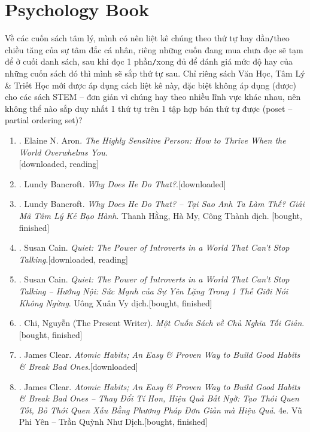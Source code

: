 \documentclass{article}
\begin{document}
\section{Psychology Book}
Về các cuốn sách tâm lý, mình có nên liệt kê chúng theo thứ tự hay dần\texttt{/}theo chiều tăng của sự tâm đắc cá nhân, riêng những cuốn đang mua chưa đọc sẽ tạm để ở cuối danh sách, sau khi đọc 1 phần\texttt{/}xong đủ để đánh giá mức độ hay của những cuốn sách đó thì mình sẽ sắp thứ tự sau. Chỉ riêng sách Văn Học, Tâm Lý \& Triết Học mới được áp dụng cách liệt kê này, đặc biệt không áp dụng (được) cho các sách STEM -- đơn giản vì chúng hay theo nhiều lĩnh vực khác nhau, nên không thể nào sắp duy nhất 1 thứ tự trên 1 tập hợp bán thứ tự được (poset -- partial ordering set)?
\begin{enumerate}
	\item \cite{Aron2013}. Elaine N. Aron. \textit{The Highly Sensitive Person: How to Thrive When the World Overwhelms You}.\\\mbox{}\hfill\textsf{[downloaded, reading]}
	\item \cite{Bansch2001}. Lundy Bancroft. \textit{Why Does He Do That?}.\hfill\textsf{[downloaded]}
	\item \cite{Bancroft2019}. Lundy Bancroft. \textit{Why Does He Do That? -- Tại Sao Anh Ta Làm Thế? Giải Mã Tâm Lý Kẻ Bạo Hành}. Thanh Hằng, Hà My, Công Thành dịch. \hfill\textsf{[bought, finished]}
	\item \cite{Cain2013}. Susan Cain. \textit{Quiet: The Power of Introverts in a World That Can't Stop Talking}.\hfill\textsf{[downloaded, reading]}
	\item \cite{Cain2022}. Susan Cain. \textit{Quiet: The Power of Introverts in a World That Can't Stop Talking -- Hướng Nội: Sức Mạnh của Sự Yên Lặng Trong 1 Thế Giới Nói Không Ngừng}. Uông Xuân Vy dịch.\hfill\textsf{[bought, finished]}
	\item \cite{Chi2022}. Chi, Nguyễn (The Present Writer). \textit{Một Cuốn Sách về Chủ Nghĩa Tối Giản}. \hfill\textsf{[bought, finished]}
	\item \cite{Clear2018}. James Clear. \textit{Atomic Habits; An Easy \& Proven Way to Build Good Habits \& Break Bad Ones}.\hfill\textsf{[downloaded]}
	\item \cite{Clear2022}. James Clear. \textit{Atomic Habits; An Easy \& Proven Way to Build Good Habits \& Break Bad Ones -- Thay Đổi Tí Hon, Hiệu Quả Bất Ngờ: Tạo Thói Quen Tốt, Bỏ Thói Quen Xấu Bằng Phương Pháp Đơn Giản mà Hiệu Quả}. 4e. Vũ Phi Yên -- Trần Quỳnh Như Dịch.\hfill\textsf{[bought, finished]}

\end{enumerate}
\end{document}
